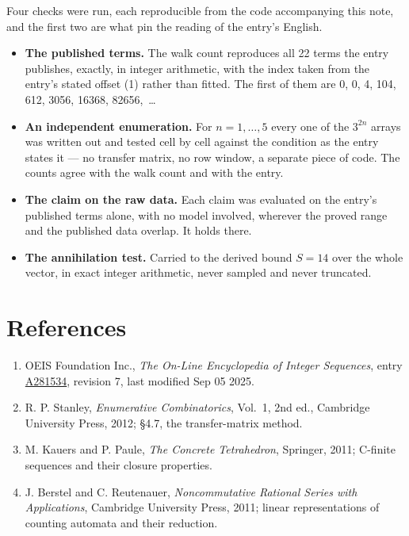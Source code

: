 \documentclass[11pt]{article}
\theoremstyle{definition}
\begin{document}
Four checks were run, each reproducible from the code accompanying this note, and the first two are what pin the reading of the entry's English.

\begin{itemize}

\item {\bfseries The published terms.} The walk count reproduces all 22 terms the entry publishes, exactly, in integer arithmetic, with the index taken from the entry's stated offset (1) rather than fitted. The first of them are 0, 0, 4, 104, 612, 3056, 16368, 82656,~\dots

\item {\bfseries An independent enumeration.} For $n = 1,\dots,5$ every one of the $3^{2n}$ arrays was written out and tested cell by cell against the condition as the entry states it --- no transfer matrix, no row window, a separate piece of code. The counts agree with the walk count and with the entry.

\item {\bfseries The claim on the raw data.} Each claim was evaluated on the entry's published terms alone, with no model involved, wherever the proved range and the published data overlap. It holds there.

\item {\bfseries The annihilation test.} Carried to the derived bound $S = 14$ over the whole vector, in exact integer arithmetic, never sampled and never truncated.

\end{itemize}

\section{References}

\begin{enumerate}

\item OEIS Foundation Inc., \emph{The On-Line Encyclopedia of Integer Sequences}, entry \href{https://oeis.org/A281534}{A281534}, revision 7, last modified Sep 05 2025.

\item R. P. Stanley, \emph{Enumerative Combinatorics}, Vol.~1, 2nd ed., Cambridge University Press, 2012; \S4.7, the transfer-matrix method.

\item M. Kauers and P. Paule, \emph{The Concrete Tetrahedron}, Springer, 2011; C-finite sequences and their closure properties.

\item J. Berstel and C. Reutenauer, \emph{Noncommutative Rational Series with Applications}, Cambridge University Press, 2011; linear representations of counting automata and their reduction.

\end{enumerate}
\end{document}

